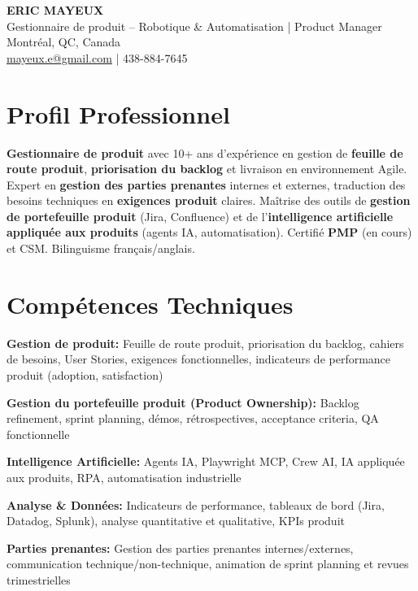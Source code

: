 \documentclass[11pt,a4paper]{article}
\begin{document}
\begin{center}
    {\LARGE \textbf{ERIC MAYEUX}}\\
    \vspace{4pt}
    {\large Gestionnaire de produit -- Robotique \& Automatisation | Product Manager}\\
    \vspace{4pt}
    Montréal, QC, Canada\\
    \href{mailto:mayeux.e@gmail.com}{mayeux.e@gmail.com} | 438-884-7645
\end{center}

\vspace{8pt}

\section*{Profil Professionnel}
\noindent
\textbf{Gestionnaire de produit} avec 10+ ans d'expérience en gestion de \textbf{feuille de route produit}, \textbf{priorisation du backlog} et livraison en environnement Agile. Expert en \textbf{gestion des parties prenantes} internes et externes, traduction des besoins techniques en \textbf{exigences produit} claires. Maîtrise des outils de \textbf{gestion de portefeuille produit} (Jira, Confluence) et de l'\textbf{intelligence artificielle appliquée aux produits} (agents IA, automatisation). Certifié \textbf{PMP} (en cours) et CSM. Bilinguisme français/anglais.

\section*{Compétences Techniques}

\textbf{Gestion de produit:} Feuille de route produit, priorisation du backlog, cahiers de besoins, User Stories, exigences fonctionnelles, indicateurs de performance produit (adoption, satisfaction)

\textbf{Gestion du portefeuille produit (Product Ownership):} Backlog refinement, sprint planning, démos, rétrospectives, acceptance criteria, QA fonctionnelle

\textbf{Intelligence Artificielle:} Agents IA, Playwright MCP, Crew AI, IA appliquée aux produits, RPA, automatisation industrielle

\textbf{Analyse \& Données:} Indicateurs de performance, tableaux de bord (Jira, Datadog, Splunk), analyse quantitative et qualitative, KPIs produit

\textbf{Parties prenantes:} Gestion des parties prenantes internes/externes, communication technique/non-technique, animation de sprint planning et revues trimestrielles
\end{document}
